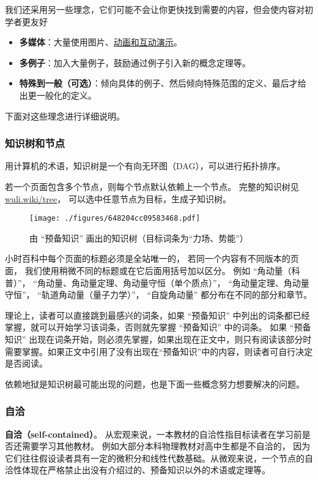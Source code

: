 我们还采用另一些理念，它们可能不会让你更快找到需要的内容，但会使内容对初学者更友好
\begin{itemize}
\item \textbf{多媒体}：大量使用图片、\href{https://wuli.wiki/apps/}{动画和互动演示}。
\item \textbf{多例子}：加入大量例子，鼓励通过例子引入新的概念定理等。
\item \textbf{特殊到一般（可选）}：倾向具体的例子、然后倾向特殊范围的定义、最后才给出更一般化的定义。
\end{itemize}
下面对这些理念进行详细说明。


\subsubsection{知识树和节点}
用计算机的术语，知识树是一个有向无环图（DAG），可以进行拓扑排序。 %

若一个页面包含多个节点，则每个节点默认依赖上一个节点。 完整的知识树见 \href{https://wuli.wiki/tree}{wuli.wiki/tree}， 可以选中任意节点为目标，生成子知识树。

\begin{figure}[ht]
\centering
\texttt{[image: ./figures/648204cc09583468.pdf]}
\caption{由 “预备知识” 画出的知识树（目标词条为“力场、势能”）}\label{fig_about_1}
\end{figure}

小时百科中每个页面的标题必须是全站唯一的， 若同一个内容有不同版本的页面， 我们使用稍微不同的标题或在它后面用括号加以区分。 例如 “角动量（科普）”， “角动量、角动量定理、角动量守恒（单个质点）”， “角动量定理、角动量守恒”， “轨道角动量（量子力学）”， “自旋角动量” 都分布在不同的部分和章节。

理论上，读者可以直接跳到最感兴的词条，如果 “预备知识” 中列出的词条都已经掌握，就可以开始学习该词条，否则就先掌握 “预备知识” 中的词条。 如果 “预备知识” 出现在词条开始，则必须先掌握，如果出现在正文中，则只有阅读该部分时需要掌握。如果正文中引用了没有出现在“预备知识”中的内容，则读者可自行决定是否阅读。

依赖地狱是知识树最可能出现的问题，也是下面一些概念努力想要解决的问题。

\subsubsection{自洽}
\textbf{自洽（self-contained）}。 从宏观来说，一本教材的自洽性指目标读者在学习前是否还需要学习其他教材。 例如大部分本科物理教材对高中生都是不自洽的， 因为它们往往假设读者具有一定的微积分和线性代数基础。从微观来说，一个节点的自洽性体现在严格禁止出没有介绍过的、预备知识以外的术语或定理等。

